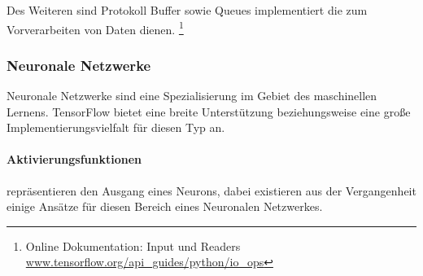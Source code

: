 \noindent
Des Weiteren sind Protokoll Buffer sowie Queues implementiert die zum Vorverarbeiten von Daten dienen.
\footnote{Online Dokumentation: Input und Readers \url{www.tensorflow.org/api_guides/python/io_ops}}

\subsubsection{Neuronale Netzwerke}

Neuronale Netzwerke sind eine Spezialisierung im Gebiet des maschinellen Lernens. 
TensorFlow bietet eine breite Unterstützung beziehungsweise eine große Implementierungsvielfalt für diesen Typ an. 

\paragraph{Aktivierungsfunktionen} repräsentieren den Ausgang eines Neurons, dabei existieren aus der Vergangenheit einige Ansätze für diesen Bereich eines Neuronalen Netzwerkes. 
